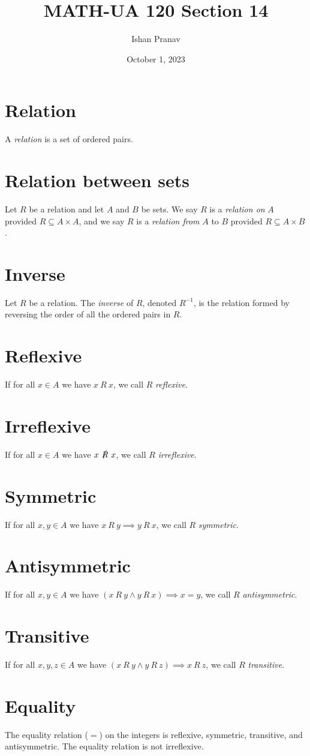 \documentclass[12pt]{article}
\title{MATH-UA 120 Section 14}
\author{Ishan Pranav}
\date{October 1, 2023}
\begin{document}
\maketitle
\section*{Relation}
A \textit{relation} is a set of ordered pairs.
\section*{Relation between sets}
Let $R$ be a relation and let $A$ and $B$ be sets. We say $R$ is a \textit{relation on} $A$ provided $R\subseteq A\times A$, and we say $R$ is a \textit{relation from} $A$ to $B$ provided $R\subseteq A\times B$.
\section*{Inverse}
Let $R$ be a relation. The \textit{inverse} of $R$, denoted $R^{-1}$, is the relation formed by reversing the order of all the ordered pairs in $R$.
\section*{Reflexive}
If for all $x\in A$ we have $x~R~x$, we call $R$ \textit{reflexive}.
\section*{Irreflexive}
If for all $x\in A$ we have $x~\slashed{R}~x$, we call $R$ \textit{irreflexive}.
\section*{Symmetric}
If for all $x,y\in A$ we have $x~R~y\implies y~R~x$, we call $R$ \textit{symmetric}.
\section*{Antisymmetric}
If for all $x,y\in A$ we have $(x~R~y\land y~R~x)\implies x=y$, we call $R$ \textit{antisymmetric}.
\section*{Transitive}
If for all $x,y,z\in A$ we have $(x~R~y\land y~R~z)\implies x~R~z$, we call $R$ \textit{transitive}.
\section*{Equality}
The equality relation ($=$) on the integers is reflexive, symmetric, transitive, and antisymmetric. The equality relation is not irreflexive.
\end{document}
